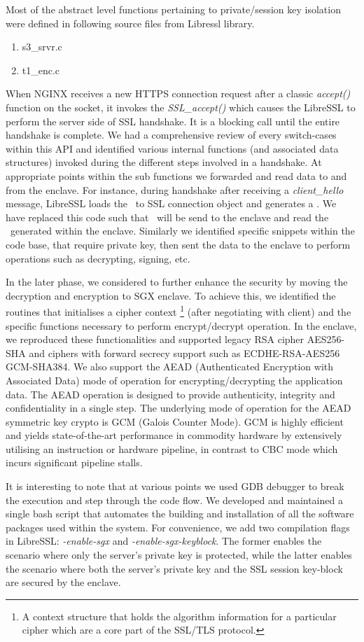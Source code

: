 \documentclass[../main.tex]{subfiles}
\begin{document}
Most of the abstract level functions pertaining to private/session key
isolation were defined in following source files from Libressl library.
\begin{enumerate}
  \item s3\_srvr.c
  \item t1\_enc.c
\end{enumerate}
 
When NGINX receives a new HTTPS connection request after a classic
\textit{accept()} function on the socket, it invokes the \textit{SSL\_accept()}
which causes the LibreSSL to perform the server side of SSL handshake. It is
a blocking call until the entire handshake is complete. We had a comprehensive
review of every switch-cases within this API and identified various internal
functions (and associated data structures) invoked during the different steps
involved in a handshake. At appropriate points within the sub functions we
forwarded and read data to and from the enclave. For instance, during
handshake after receiving a \textit{client\_hello} message, LibreSSL loads the
\crandom~to SSL connection object and generates a \srandom. We have replaced
this code such that \crandom~will be send to the enclave and read the
\srandom~generated within the enclave. Similarly we identified specific
snippets within the code base, that require private key, then sent the data to
the enclave to perform operations such as decrypting, signing, etc. 

In the later phase, we considered to further enhance the security by moving
the decryption and encryption to SGX enclave. To achieve this, we identified
the routines that initialises a cipher context \footnote{A context structure
that holds the algorithm information for a particular cipher which are a core
part of the SSL/TLS protocol.} (after negotiating with client) and the
specific functions necessary to perform encrypt/decrypt operation. In the
enclave, we reproduced these functionalities and supported legacy RSA cipher
AES256-SHA and ciphers with forward secrecy support such as ECDHE-RSA-AES256
GCM-SHA384. We also support the AEAD (Authenticated Encryption with Associated
Data) mode of operation for encrypting/decrypting the application data. The
AEAD operation is designed to provide authenticity, integrity and
confidentiality in a single step. The underlying mode of operation for the
AEAD symmetric key crypto is GCM (Galois Counter Mode). GCM is highly
efficient and yields state-of-the-art performance in commodity hardware by
extensively utilising an instruction or hardware pipeline, in contrast to CBC
mode which incurs significant pipeline stalls.

It is interesting to note that at various points we used GDB debugger to break
the execution and step through the code flow. We developed and maintained
a single bash script that automates the building and installation of all the
software packages used within the system. For convenience, we add two
compilation flags in LibreSSL: \textit{-enable-sgx} and
\textit{-enable-sgx-keyblock}. The former enables the scenario where only the
server's private key is protected, while the latter enables the scenario where
both the server's private key and the SSL session key-block are secured by the
enclave.
\end{document}
